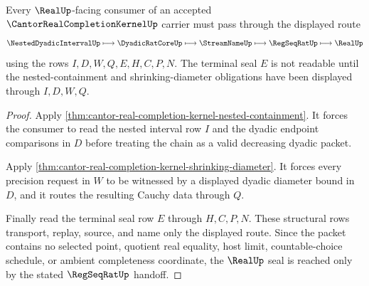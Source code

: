 \begin{theorem}
\label{thm:cantor-real-completion-kernel-regseqrat-real-sealing}
Every $\RealUp$-facing consumer of an accepted $\CantorRealCompletionKernelUp$ carrier must pass through the displayed route
$$
\NestedDyadicIntervalUp \longmapsto \DyadicRatCoreUp \longmapsto \StreamNameUp \longmapsto \RegSeqRatUp \longmapsto \RealUp
$$
using the rows $I,D,W,Q,E,H,C,P,N$. The terminal seal $E$ is not readable until the nested-containment and shrinking-diameter obligations have been displayed through $I,D,W,Q$.
\end{theorem}
\begin{proof}
Apply \autoref{thm:cantor-real-completion-kernel-nested-containment}. It forces the consumer to read the nested interval row $I$ and the dyadic endpoint comparisons in $D$ before treating the chain as a valid decreasing dyadic packet.

Apply \autoref{thm:cantor-real-completion-kernel-shrinking-diameter}. It forces every precision request in $W$ to be witnessed by a displayed dyadic diameter bound in $D$, and it routes the resulting Cauchy data through $Q$.

Finally read the terminal seal row $E$ through $H,C,P,N$. These structural rows transport, replay, source, and name only the displayed route. Since the packet contains no selected point, quotient real equality, host limit, countable-choice schedule, or ambient completeness coordinate, the $\RealUp$ seal is reached only by the stated $\RegSeqRatUp$ handoff.
\end{proof}



